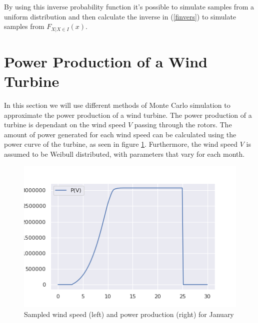 \documentclass[a4paper]{article}
\begin{document}
By using this inverse probability function it's possible to simulate samples from a uniform distribution and then calculate the inverse in (\ref{finvers}) to simulate samples from $F_{X| X\in I}(x)$.

\newpage
\section{Power Production of a Wind Turbine}
\label{sec:oneTurbine}
In this section we will use different methods of Monte Carlo simulation to approximate the power production of a wind turbine. The power production of a turbine is dependant on the wind speed $V$ passing through the rotors. The amount of power generated for each wind speed can be calculated using the power curve of the turbine, as seen in figure \ref{fig:powercurve}. Furthermore, the wind speed $V$ is assumed to be Weibull distributed, with parameters that vary for each month.

\begin{figure}[H]
    \centering
    \includegraphics[width = 1.0\textwidth]{images/powercurve}
    \caption{Sampled wind speed (left) and power production (right) for January}
    \label{fig:powercurve}
\end{figure}
\end{document}
